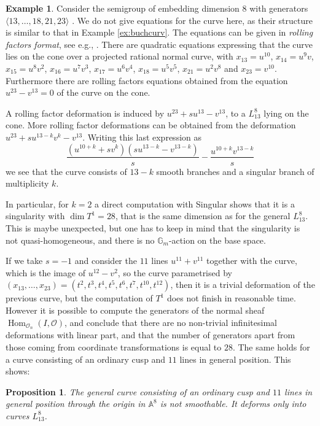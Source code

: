 \documentclass{amsart}
\newcommand{\A}{\mathbb{A}}
\newcommand{\G}{\mathbb{G}}
\DeclareMathOperator{\Hom}{Hom}
\newcommand{\mO}{\mathcal{O}}
\newtheorem{prop}[thm]{Proposition}
\theoremstyle{definition}
\newtheorem{ex}[thm]{Example}
\theoremstyle{remark}
\begin{document}
\begin{ex}
Consider the %
semigroup of embedding dimension 8 with generators
$\langle 13,\dots,18, 21,23 \rangle$ \cite[Example 2.1 (2)]{Ko}.
We do not give equations for the curve here, as their structure is  similar to that in Example 
\ref{ex:buchcurv}. The equations can be given in \textit{rolling factors format}, see
e.g., \cite[Ch. 12]{St4}.
There are quadratic equations expressing that the curve lies 
 on the cone over a  projected  rational normal curve,
 with $x_{13}=u^{10}$, $x_{14}=u^9v$,  $x_{15}=u^8v^2$,  $x_{16}=u^7v^3$, 
  $x_{17}=u^6v^4$, $x_{18}=u^5v^5$,  $x_{21}=u^2v^8$ 
  and $x_{23}=v^{10}$. Furthermore there are rolling factors equations obtained 
  from the equation $u^{23}-v^{13}=0$ of the curve on the cone. 
  
  A  rolling factor deformation is induced by $u^{23}+su^{13}-v^{13}$,
   to a $L_{13}^8$ lying on the cone.
  More rolling factor deformations can be obtained 
   from the deformation $u^{23}+su^{13-k}v^k-v^{13}$.
    Writing this last expression as
 \[
 \frac{(u^{10+k }+sv^k)(su^{13-k}-v^{13-k})}s-\frac{u^{10+k}v^{13-k}}s
 \]
  we see that the curve consists of $13-k$ smooth branches and a singular branch of  multiplicity $k$.
  
  In particular, for $k=2$ a direct computation with Singular  \cite{Sing} shows that it is a singularity
  with $\dim T^1 = 28$, that is the same dimension as for the general $L_{13}^8$. 
  This is maybe unexpected, but one has to keep in mind 
 that the singularity
  is not quasi-homogeneous, and there is no $\G_m$-action on the base space.
  
  If we take $s=-1$ and consider the $11$ lines $u^{11}+v^{11}$ together with the curve,
  which is the image of $u^{12}-v^2$, so the curve parametrised by
  $(x_{13},\dots,x_{23})=(t^2, t^3,t^4,t^5,t^6,t^7,t^{10},t^{12})$, 
  then it is a trivial deformation of the previous curve, but
  the computation of $T^1$
  does not finish in reasonable time. However it is possible to compute the  generators of the 
  normal sheaf  $ \Hom_{\mO_n}(I,\mO)$,
   and conclude that there are no non-trivial infinitesimal deformations 
  with linear part, and that the number of generators apart from those coming from coordinate 
  transformations is equal to $28$. 
  The same holds for a curve consisting of an ordinary cusp and $11$ lines in general
  position. This shows:
  \begin{prop}\label{prop:cusplines}
  The general curve consisting of  an ordinary cusp and $11$ lines in general
  position through the origin in    $\A^8$ is not smoothable. It deforms only into 
  curves $L_{13}^8$.
  \end{prop}
\end{ex}
\end{document}
